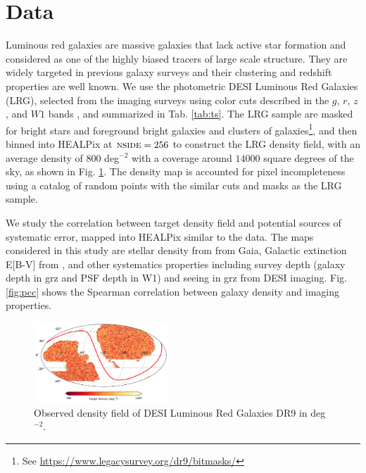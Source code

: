\section{Data}
\label{sec:data}
Luminous red galaxies are massive galaxies that lack active star formation and considered as one of the highly biased tracers of large scale structure. They are widely targeted in previous galaxy surveys and their clustering and redshift properties are well known. We use the photometric DESI Luminous Red Galaxies (LRG), selected from the imaging surveys \citep{dey2018overview} using color cuts described in the $g$, $r$, $z$, and $W1$ bands \citep[see,][]{zhou2021clustering}, and summarized in Tab. \ref{tab:ts}. The LRG sample are masked for bright stars and foreground bright galaxies and clusters of galaxies\footnote{See \url{https://www.legacysurvey.org/dr9/bitmasks/}}, and then binned into HEALPix \citep{gorski2005healpix} at $\textsc{nside}=256$ to construct the LRG density field, with an average density of $800$ deg$^{-2}$ with a coverage around $14000$ square degrees of the sky, as shown in Fig. \ref{fig:ng}. The density map is accounted for pixel incompleteness using a catalog of random points with the similar cuts and masks as the LRG sample. 

We study the correlation between target density field and potential sources of systematic error, mapped into HEALPix similar to the data. The maps considered in this study are stellar density from  from Gaia,  Galactic extinction E[B-V] from \cite{schlegel1998maps}, and other systematics properties including survey depth (galaxy depth in grz and PSF depth in W1) and seeing in grz from DESI imaging. Fig. \ref{fig:pcc} shows the Spearman correlation between galaxy density and imaging properties. 


\begin{figure}
    \centering
    \includegraphics[width=0.45\textwidth]{figures/lrgdens.pdf}
    \caption{Observed density field of DESI Luminous Red Galaxies DR9 in deg$^{-2}$.}
    \label{fig:ng}
\end{figure}

